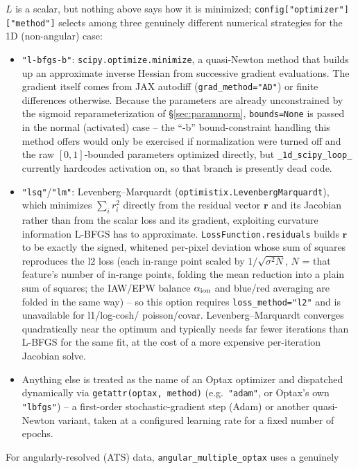 \documentclass[11pt]{article}
\newcommand{\code}[1]{\texttt{#1}}
\begin{document}
$L$ is a scalar, but nothing above says how it is minimized; \code{config["optimizer"]["method"]}
selects among three genuinely different numerical strategies for the 1D (non-angular) case:
\begin{itemize}
  \item \code{"l-bfgs-b"}: \code{scipy.optimize.minimize}, a quasi-Newton method that
    builds up an approximate inverse Hessian from successive gradient evaluations. The
    gradient itself comes from JAX autodiff (\code{grad\_method="AD"}) or finite differences
    otherwise. Because the parameters are already unconstrained by the sigmoid
    reparameterization of \S\ref{sec:paramnorm}, \code{bounds=None} is passed in the normal
    (activated) case -- the ``-b'' bound-constraint handling this method offers would only
    be exercised if normalization were turned off and the raw $[0,1]$-bounded parameters
    optimized directly, but \code{\_1d\_scipy\_loop\_} currently hardcodes activation on, so
    that branch is presently dead code.
  \item \code{"lsq"}/\code{"lm"}: Levenberg--Marquardt (\code{optimistix.LevenbergMarquardt}),
    which minimizes $\sum_i r_i^2$ directly from the residual vector $\mathbf r$ and its
    Jacobian rather than from the scalar loss and its gradient, exploiting curvature
    information L-BFGS has to approximate. \code{LossFunction.residuals} builds $\mathbf r$
    to be exactly the signed, whitened per-pixel deviation whose sum of squares reproduces
    the l2 loss (each in-range point scaled by $1/\sqrt{\sigma^2 N}$, $N$ = that feature's
    number of in-range points, folding the mean reduction into a plain sum of squares; the
    IAW/EPW balance $\alpha_{\rm ion}$ and blue/red averaging are folded in the same way) --
    so this option requires \code{loss\_method="l2"} and is unavailable for l1/log-cosh/
    poisson/covar. Levenberg--Marquardt converges quadratically near the optimum and
    typically needs far fewer iterations than L-BFGS for the same fit, at the cost of a more
    expensive per-iteration Jacobian solve.
  \item Anything else is treated as the name of an Optax optimizer and dispatched
    dynamically via \code{getattr(optax, method)} (e.g.\ \code{"adam"}, or Optax's own
    \code{"lbfgs"}) -- a first-order stochastic-gradient step (Adam) or another quasi-Newton
    variant, taken at a configured learning rate for a fixed number of epochs.
\end{itemize}
For angularly-resolved (ATS) data, \code{angular\_multiple\_optax} uses a genuinely
\end{document}
